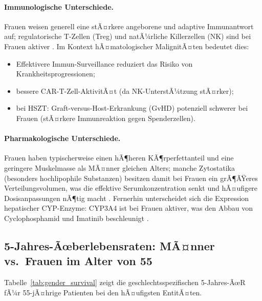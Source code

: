 ﻿\documentclass[12pt,a4paper]{article}
\theoremstyle{definition}
\begin{document}
\paragraph{Immunologische Unterschiede.}
Frauen weisen generell eine stÃ¤rkere angeborene und adaptive Immunantwort auf;
regulatorische T-Zellen (Treg) und natÃ¼rliche Killerzellen (NK) sind bei Frauen
aktiver \cite{frey2010}. Im Kontext hÃ¤matologischer MalignitÃ¤ten bedeutet dies:
\begin{itemize}
  \item Effektivere Immun-Surveillance reduziert das Risiko von Krankheitsprogressionen;
  \item bessere CAR-T-Zell-AktivitÃ¤t (da NK-UnterstÃ¼tzung stÃ¤rker);
  \item bei HSZT: Graft-versus-Host-Erkrankung (GvHD) potenziell schwerer bei
        Frauen (stÃ¤rkere Immunreaktion gegen Spenderzellen).
\end{itemize}

\paragraph{Pharmakologische Unterschiede.}
Frauen haben typischerweise einen hÃ¶heren KÃ¶rperfettanteil und eine geringere
Muskelmasse als MÃ¤nner gleichen Alters; manche Zytostatika (besonders
hochlipophile Substanzen) besitzen damit bei Frauen ein grÃ¶ÃŸeres
Verteilungsvolumen, was die effektive Serumkonzentration senkt und
hÃ¤ufigere Dosisanpassungen nÃ¶tig macht \cite{frey2010}. Fernerhin unterscheidet
sich die Expression hepatischer CYP-Enzyme: CYP3A4 ist bei Frauen aktiver, was
den Abbau von Cyclophosphamid und Imatinib beschleunigt \cite{mccabe2015}.

\subsection{5-Jahres-Ãœberlebensraten: MÃ¤nner vs.\ Frauen im Alter von 55}

Tabelle~\ref{tab:gender_survival} zeigt die geschlechtsspezifischen 5-Jahres-ÃœR
fÃ¼r 55-jÃ¤hrige Patienten bei den hÃ¤ufigsten EntitÃ¤ten.
\end{document}
